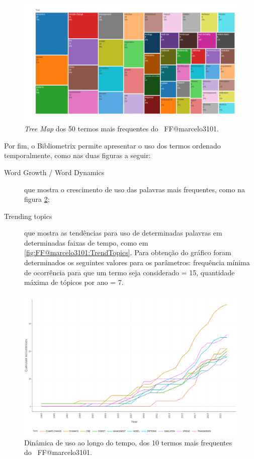 \begin{figure}
    \centering
    \includegraphics[width=1\textwidth]{exploratory-data-analysis/marcelo3101/PesqBibliogr/ForestFire/WoS-20221204/assets/TreeMapFFmarcelo3101.png}
    \caption{\textit{Tree Map} dos 50 termos mais frequentes do \dataset\ FF@marcelo3101.}
    \label{fig:FF@marcelo3101:TreeMap}
\end{figure}

Por fim, o Bibliometrix permite apresentar o uso dos termos ordenado temporalmente, como nas duas figuras a seguir:

\begin{description}
    \item [Word Growth / Word Dynamics] que mostra o crescimento de uso das palavras mais frequentes, como na figura \ref{fig:FF@marcelo3101:WordDynamics};
    \item [Trending topics] que mostra as tendências para uso de determinadas palavras em determinadas faixas de tempo, como em \ref{fig:FF@marcelo3101:TrendTopics}. Para obtenção do gráfico foram determinados os seguintes valores para os parâmetros: frequência mínima de ocorrência para que um termo seja considerado = 15, quantidade máxima de tópicos por ano = 7.
\end{description}

\begin{figure}
    \centering
    \includegraphics[width=1\textwidth]{exploratory-data-analysis/marcelo3101/PesqBibliogr/ForestFire/WoS-20221204/assets/WordDynamicsFFmarcelo3101.png}
    \caption{Dinâmica de uso ao longo do tempo, dos 10 termos mais frequentes do \dataset\ FF@marcelo3101.}
    \label{fig:FF@marcelo3101:WordDynamics}
\end{figure}

